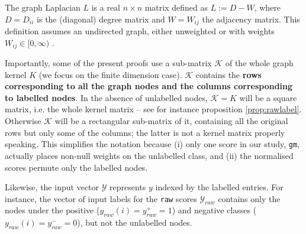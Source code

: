 \documentclass[12pt]{article}  %
\begin{document}
The graph Laplacian $L$ is a real $n \times n$ matrix defined as $L := D - W$, where $D = D_{ii}$ is the (diagonal) degree matrix and $W = W_{ij}$ the adjacency matrix.
This definition assumes an undirected graph, either unweighted or with weights $W_{ij} \in [0, \infty)$ \citep{smola2003kernels}.


\begin{table}[ht]
\centering
\caption{Notation of functions and operators. }
\label{tab:notation-funs}
\end{table}


Importantly, some of the present proofs use a sub-matrix $\mathcal{K}$ of the whole graph kernel $K$ \cite{smola2003kernels} (we focus on the finite dimension case). 
$\mathcal{K}$ contains the \textbf{rows corresponding to all the graph nodes and the columns corresponding to labelled nodes}. 
In the absence of unlabelled nodes, $\mathcal{K} = K$ will be a square matrix, i.e. the whole kernel matrix -- see for instance proposition \ref{prop:rawlabel}.
Otherwise $\mathcal{K}$ will be a rectangular sub-matrix of it, containing all the original rows but only some of the columns; the latter is not a kernel matrix properly speaking. 
This simplifies the notation because (i) only one score in our study, \texttt{gm}, actually places non-null weights on the unlabelled class, and (ii) the normalised scores permute only the labelled nodes.

Likewise, the input vector $\mathcal{Y}$ represents $y$ indexed by the labelled entries. 
For instance, the vector of input labels for the \texttt{raw} scores $\mathcal{Y}_{raw}$ contains only the nodes under the positive ($y_{raw}(i) = y_{raw}^+ = 1$) and negative classes ($y_{raw}(i) = y_{raw}^- = 0$), but not the unlabelled nodes. 
\end{document}
